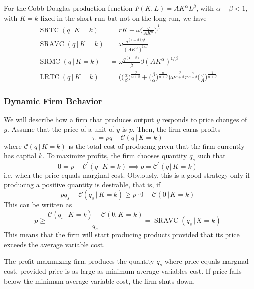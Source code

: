 \documentclass{article}
\DeclareMathOperator{\SRTC}{SRTC}
\DeclareMathOperator{\SRMC}{SRMC}
\DeclareMathOperator{\SRAVC}{SRAVC}
\DeclareMathOperator{\LRTC}{LRTC}
\begin{document}
      \begin{example}
        For the Cobb-Douglas production function $F(K, L) = A K^\alpha L^\beta$, with $\alpha + \beta < 1$, with $K=k$ fixed in the short-run but not on the long run, we have
        \begin{align*}
          \SRTC(q\,|\,K=k) & = r K + \omega \bigg(\frac{q}{A K^\alpha} \bigg)^{\frac{1}{\beta}} \\
          \SRAVC(q\,|\,K=k) & = \omega \frac{q^{(1-\beta)/\beta}}{(A K^\alpha)^{1/\beta}} \\
          \SRMC(q\,|\,K=k) & = \omega \frac{q^{(1 - \beta)}}{\beta}{\beta (A K^\alpha)^{1/\beta}} \\
          \LRTC(q\,|\,K=k) & = \Bigg( \Big(\frac{\alpha}{\beta}\Big)^{\frac{\beta}{\alpha + \beta}} + \Big(\frac{\beta}{\alpha}\Big)^{\frac{\alpha}{\alpha + \beta}} \Bigg) \omega^{\frac{\beta}{\alpha + \beta}} r^{\frac{\alpha}{\alpha + \beta}} \bigg(\frac{q}{A}\bigg)^{\frac{1}{\alpha + \beta}}
        \end{align*}
      \end{example}

    \subsubsection{Dynamic Firm Behavior}

      We will describe how a firm that produces output $y$ responds to price changes of $y$. Assume that the price of a unit of $y$ is $p$. Then, the firm earns profits 
      \[\pi = p q - \mathcal{C}(q\,|\,K = k)\]
      where $\mathcal{C}(q\,|\,K=k)$ is the total cost of producing given that the firm currently has capital $k$. To maximize profits, the firm chooses quantity $q_s$ such that 
      \[0 = p - \mathcal{C}^\prime (q\,|\,K = k) \implies p = \mathcal{C}^\prime (q\,|\,K = k)\]
      i.e. when the price equals marginal cost. Obviously, this is a good strategy only if producing a positive quantity is desirable, that is, if 
      \[p q_s - \mathcal{C}(q_s\,|\,K=k) \geq p \cdot 0 - \mathcal{C} (0\,|\,K=k)\] 
      This can be written as
      \[p \geq \frac{\mathcal{C}(q_s \,|\, K=k) - \mathcal{C}(0, K=k)}{q_s} = \SRAVC(q_s\,|\,K=k)\]
      This means that the firm will start producing products provided that its price exceeds the average variable cost. 

      \begin{theorem}
        The profit maximizing firm produces the quantity $q_s$ where price equals marginal cost, provided price is as large as minimum average variables cost. If price falls below the minimum average variable cost, the firm shuts down. 
      \end{theorem}
\end{document}
